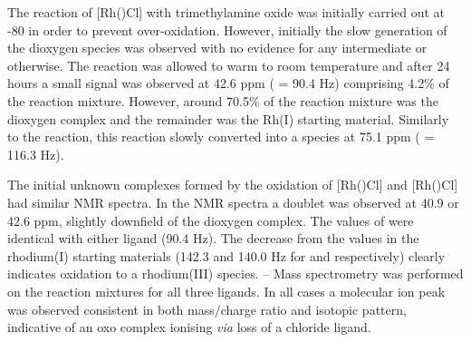 The reaction of [Rh(\tBuxantphosk)Cl] with trimethylamine oxide was initially carried out at -80 \degC{} in order to prevent over-oxidation.  However, initially the slow generation of the dioxygen species was observed with no evidence for any intermediate or otherwise.  The reaction was allowed to warm to room temperature and after 24 hours a small signal was observed at 42.6 ppm (\JRhP{} = 90.4 Hz) comprising 4.2\% of the reaction mixture.  However, around 70.5\%{} of the reaction mixture was the dioxygen complex and the remainder was the Rh(I) starting material.  Similarly to the \tButhixantphos{} reaction, this reaction slowly converted into a species at 75.1 ppm (\JRhP{} = 116.3 Hz).  

The initial unknown complexes formed by the oxidation of [Rh(\tBuxantphosk)Cl] and [Rh(\tButhixantphosk)Cl] had similar NMR spectra. In the \phosphorus{} NMR spectra a doublet was observed at 40.9 or 42.6 ppm, slightly downfield of the dioxygen complex.  The values of \JRhP{} were identical with either ligand (90.4 Hz).  The decrease from the values in the rhodium(I) starting materials (142.3 and 140.0 Hz for \tBuxantphos{} and \tButhixantphos{} respectively) clearly indicates oxidation to a rhodium(III) species.   -- Mass spectrometry was performed on the reaction mixtures for all three \tBuxantphos{} ligands.  In all cases a molecular ion peak was observed consistent in both mass$/$charge ratio and isotopic pattern, indicative of an oxo complex ionising \emph{via} loss of a chloride ligand.


